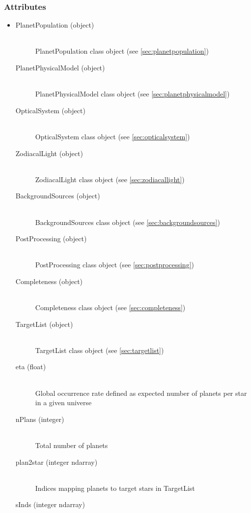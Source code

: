 \documentclass[cleanfoot]{asme2ej}
\begin{document}
\subsubsection{Attributes}
\begin{itemize}
    \item
    \begin{description}
        \item[PlanetPopulation (object)] \hfill \\
        PlanetPopulation class object (see \ref{sec:planetpopulation})
        \item[PlanetPhysicalModel (object)] \hfill \\
        PlanetPhysicalModel class object (see \ref{sec:planetphysicalmodel})
        \item[OpticalSystem (object)] \hfill \\
        OpticalSystem class object (see \ref{sec:opticalsystem})
        \item[ZodiacalLight (object)] \hfill \\
        ZodiacalLight class object (see \ref{sec:zodiacallight})
        \item[BackgroundSources (object)] \hfill \\
        BackgroundSources class object (see \ref{sec:backgroundsources})
        \item[PostProcessing (object)] \hfill \\
        PostProcessing class object (see \ref{sec:postprocessing})
        \item[Completeness (object)] \hfill \\
        Completeness class object (see \ref{sec:completeness})
        \item[TargetList (object)] \hfill \\
        TargetList class object (see \ref{sec:targetlist})
        \item[eta (float)] \hfill \\
        Global occurrence rate defined as expected number of planets per star in a given universe
        \item[nPlans (integer)] \hfill \\
        Total number of planets
        \item[plan2star (integer ndarray)] \hfill \\
        Indices mapping planets to target stars in TargetList
        \item[sInds (integer ndarray)] \hfill \\

\end{description}
\end{itemize}
\end{document}
